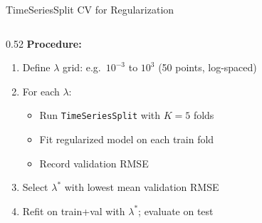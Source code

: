 \documentclass[aspectratio=169, 10pt]{beamer}
\begin{document}
\begin{frame}{TimeSeriesSplit CV for Regularization}
  \begin{columns}[T]
    \begin{column}{0.52\textwidth}
      \textbf{Procedure:}
      \begin{enumerate}
        \item Define $\lambda$ grid: e.g.\ $10^{-3}$ to $10^{3}$ (50 points, log-spaced)
        \item For each $\lambda$:
          \begin{itemize}
            \item Run \texttt{TimeSeriesSplit} with $K=5$ folds
            \item Fit regularized model on each train fold
            \item Record validation RMSE
          \end{itemize}
        \item Select $\lambda^*$ with lowest mean validation RMSE
        \item Refit on train+val with $\lambda^*$; evaluate on test
      \end{enumerate}


\end{column}
\end{columns}
\end{frame}
\end{document}
